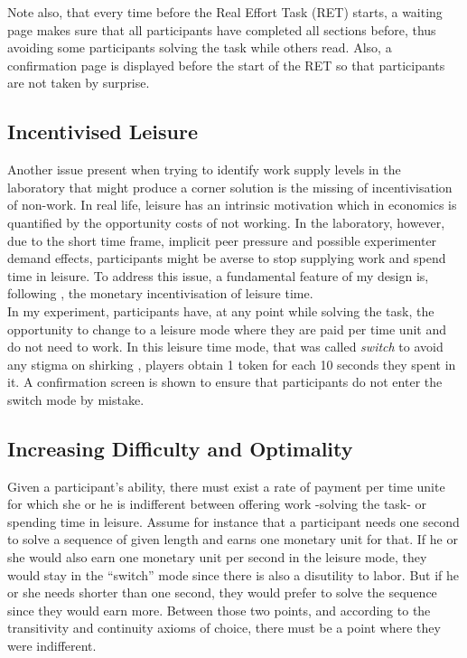     Note also, that every time before the Real Effort Task (RET) starts, a waiting page makes sure that all participants have completed all sections before, thus avoiding some participants solving the task while others read. Also, a confirmation page is displayed before the start of the RET so that participants are not taken by surprise.
    
    \subsection{Incentivised Leisure}
    \label{ss:switch_mode}
    
    Another issue present when trying to identify work supply levels in the laboratory that might produce a corner solution is the missing of incentivisation of non-work. In real life, leisure has an intrinsic motivation which in economics is quantified by the opportunity costs of not working. In the laboratory, however, due to the short time frame, implicit peer pressure and possible experimenter demand effects, participants might be averse to stop supplying work and spend time in leisure. To address this issue, a fundamental feature of my design is, following \cite{sausgruber} , the monetary incentivisation of leisure time.\\
    
    In my experiment, participants have, at any point while solving the task, the opportunity to change to a leisure mode where they are paid per time unit and do not need to work. In this leisure time mode, that was called \textit{switch} to avoid any stigma on shirking \citep{rey-biel2016, eriksson2009}, players obtain 1 token for each 10 seconds they spent in it. A confirmation screen is shown to ensure that participants do not enter the switch mode by mistake.
    
    \subsection{Increasing Difficulty and Optimality}
    
    Given a participant's ability, there must exist a rate of payment per time unite for which she or he is indifferent between offering work -solving the task- or spending time in leisure. Assume for instance that a participant needs one second to solve a sequence of given length and earns one monetary unit for that. If he or she would also earn one monetary unit per second in the leisure mode, they would stay in the ``switch'' mode since there is also a disutility to labor. But if he or she needs shorter than one second, they would prefer to solve the sequence since they would earn more. Between those two points, and according to the transitivity and continuity axioms of choice, there must be a point where they were indifferent.\\
    
